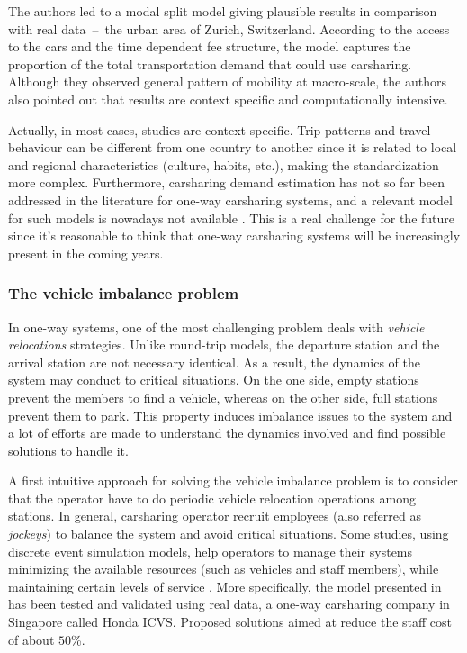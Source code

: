 The authors led to a modal split model giving plausible results in comparison with real \mbox{data -- the} urban area of Zurich, Switzerland.
According to the access to the cars and the time dependent fee structure, the model captures the proportion of the total transportation demand that could use carsharing.
Although they observed general pattern of mobility at macro-scale, the authors also pointed out that results are context specific and computationally intensive.


\bigskip
Actually, in most cases, studies are context specific.
Trip patterns and travel behaviour can be different from one country to another since it is related to local and regional characteristics (culture, habits, etc.), making the standardization more complex.
Furthermore, carsharing demand estimation has not so far been addressed in the literature for one-way carsharing systems, and a relevant model for such models is nowadays not available \cite{jorge_carsharing_2013}.
This is a real challenge for the future since it's reasonable to think that one-way carsharing systems will be increasingly present in the coming years.



\subsubsection{The vehicle imbalance problem}
In one-way systems, one of the most challenging problem deals with \emph{vehicle relocations} strategies.
Unlike round-trip models, the departure station and the arrival station are not necessary identical.
As a result, the dynamics of the system may conduct to critical situations.
On the one side, empty stations prevent the members to find a vehicle, whereas on the other side, full stations prevent them to park.
This property induces imbalance issues to the system and a lot of efforts are made to understand the dynamics involved and find possible solutions to handle it.

\medskip
A first intuitive approach for solving the vehicle imbalance problem is to consider that the operator have to do periodic vehicle relocation operations among stations.
In general, carsharing operator recruit employees (also referred as \emph{jockeys}) to balance the system and avoid critical situations.
Some studies, using discrete event simulation models, help operators to manage their systems minimizing the available resources (such as vehicles and staff members), while maintaining certain levels of service \cite{barth_simulation_1999, kek_relocation_2006, kek_decision_2009}.
More specifically, the model presented in \cite{kek_decision_2009} has been tested and validated using real data, a one-way carsharing company in Singapore called Honda ICVS.
Proposed solutions aimed at reduce the staff cost of about $50$\%.

